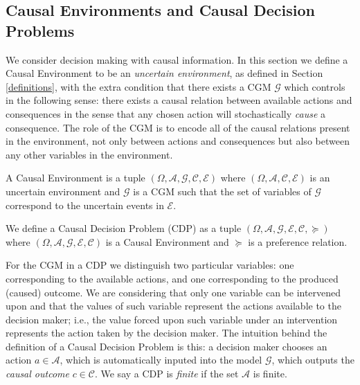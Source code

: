\documentclass{svjour3}                     %
\begin{document}
\subsection{Causal Environments and Causal Decision Problems}{\label{causal_problems}}
We consider decision making with causal information. In this section we define a Causal Environment to be an \textit{uncertain environment}, as defined in Section \ref{definitions}, with the extra condition that there exists a CGM $\mathcal{G}$ which controls in the following sense: there exists a causal relation between available actions and consequences in the sense that any chosen action will stochastically \textit{cause} a consequence. The role of the CGM is to encode all of the causal relations present in the environment, not only between actions and consequences but also between any other variables in the environment. 

\begin{definition}{\label{causal_environment}}
A Causal Environment is a tuple $(\Omega, \mathcal{A},\mathcal{G},\mathcal{C},\mathcal{E})$ where $(\Omega, \mathcal{A},\mathcal{C},\mathcal{E})$ is an uncertain environment and $\mathcal{G}$ is a CGM such that the set of variables of $\mathcal{G}$ correspond to the uncertain events in $\mathcal{E}$.
\end{definition}

\begin{definition}
We define a Causal Decision Problem (CDP) as a tuple $(\Omega, \mathcal{A}, \mathcal{G},\mathcal{E},\mathcal{C},\succeq)$ where $(\Omega, \mathcal{A}, \mathcal{G},\mathcal{E},\mathcal{C})$ is a Causal Environment and $\succeq$ is a preference relation. 
\end{definition}

For the CGM in a CDP we distinguish two particular variables: one corresponding to the available actions, and one corresponding to the produced (caused) outcome. We are considering that only one variable can be intervened upon and that the values of such variable represent the actions available to the decision maker; i.e., the value forced upon such variable under an intervention represents the action taken by the decision maker. The intuition behind the definition of a Causal Decision Problem is this: a decision maker chooses an action $a \in \mathcal{A}$, which is automatically inputed into the model $\mathcal{G}$, which outputs the \textit{causal outcome} $c \in \mathcal{C}$. We say a CDP is \textit{finite} if the set $\mathcal{A}$ is finite.
\end{document}
